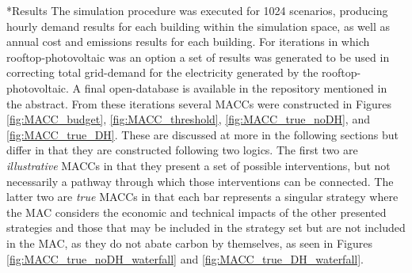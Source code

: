 \documentclass[twocolumn, a4paper,10pt]{article}
\makeatletter
\renewcommand\section{\@startsection{section}{1}{\z@}{3pt}{3pt}{\normalfont\large\bfseries}}
\makeatother
\begin{document}
\section*{Results}
The simulation procedure was executed for 1024 scenarios, producing hourly demand results for each building within the simulation space, as well as annual cost and emissions results for each building. For iterations in which rooftop-photovoltaic was an option a set of results was generated to be used in correcting total grid-demand for the electricity generated by the rooftop-photovoltaic. A final open-database is available in the repository mentioned in the abstract. From these iterations several MACCs were constructed in Figures \ref{fig:MACC_budget}, \ref{fig:MACC_threshold}, \ref{fig:MACC_true_noDH}, and \ref{fig:MACC_true_DH}. These are discussed at more in the following sections but differ in that they are constructed following two logics. The first two are \textit{illustrative} MACCs in that they present a set of possible interventions, but not necessarily a pathway through which those interventions can be connected. The latter two are \textit{true} MACCs in that each bar represents a singular strategy where the MAC considers the economic and technical impacts of the other presented strategies and those that may be included in the strategy set but are not included in the MAC, as they do not abate carbon by themselves, as seen in Figures \ref{fig:MACC_true_noDH_waterfall} and \ref{fig:MACC_true_DH_waterfall}. 
\end{document}
